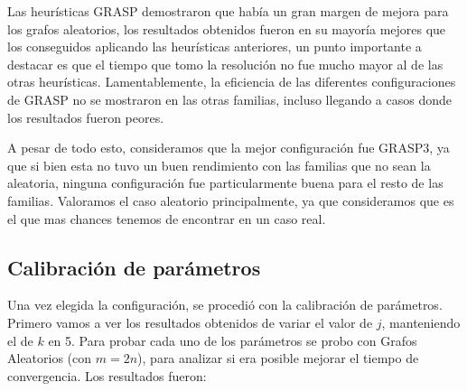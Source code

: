 Las heurísticas GRASP demostraron que había un gran margen de mejora para los grafos aleatorios, los resultados obtenidos fueron en su mayoría mejores que los conseguidos aplicando las heurísticas anteriores, un punto importante a destacar es que el tiempo que tomo la resolución no fue mucho mayor al de las otras heurísticas. Lamentablemente, la eficiencia de las diferentes configuraciones de GRASP no se mostraron en las otras familias, incluso llegando a casos donde los resultados fueron peores.

A pesar de todo esto, consideramos que la mejor configuración fue GRASP3, ya que si bien esta no tuvo un buen rendimiento con las familias que no sean la aleatoria, ninguna configuración fue particularmente buena para el resto de las familias. Valoramos el caso aleatorio principalmente, ya que consideramos que es el que mas chances tenemos de encontrar en un caso real.

\subsection{Calibración de parámetros}

Una vez elegida la configuración, se procedió con la calibración de parámetros. Primero vamos a ver los resultados obtenidos de variar el valor de $j$, manteniendo el de $k$ en 5. Para probar cada uno de los parámetros se probo con Grafos Aleatorios (con $m = 2n$), para analizar si era posible mejorar el tiempo de convergencia. Los resultados fueron:

